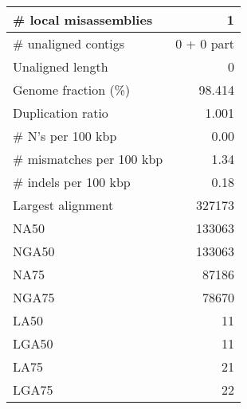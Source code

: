 \documentclass[12pt,a4paper]{article}
\begin{document}
\begin{table}[ht]
\begin{center}
\begin{tabular}{|l*{1}{|r}|}
\# local misassemblies & 1 \\ \hline
\# unaligned contigs & 0 + 0 part \\ \hline
Unaligned length & 0 \\ \hline
Genome fraction (\%) & 98.414 \\ \hline
Duplication ratio & 1.001 \\ \hline
\# N's per 100 kbp & 0.00 \\ \hline
\# mismatches per 100 kbp & 1.34 \\ \hline
\# indels per 100 kbp & 0.18 \\ \hline
Largest alignment & 327173 \\ \hline
NA50 & 133063 \\ \hline
NGA50 & 133063 \\ \hline
NA75 & 87186 \\ \hline
NGA75 & 78670 \\ \hline
LA50 & 11 \\ \hline
LGA50 & 11 \\ \hline
LA75 & 21 \\ \hline
LGA75 & 22 \\ \hline
\end{tabular}
\end{center}
\end{table}
\end{document}
